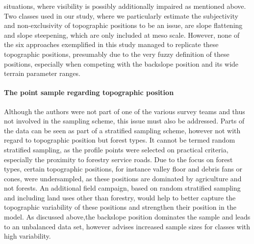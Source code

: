 \documentclass[preprint,12pt,authoryear]{elsarticle}
\begin{document}
situations, where visibility is possibly additionally impaired as mentioned above. Two classes used in our study, where we particularly estimate the subjectivity and non-exclusivity of topographic positions to be an issue, are slope flattening and slope steepening, which are only included at meso scale. However, none of the six approaches exemplified in this study managed to replicate these topographic positions, presumably due to the very fuzzy definition of these positions, especially when competing with the backslope position and its wide terrain parameter ranges.
\paragraph{The point sample regarding topographic position}
Although the authors were not part of one of the various survey teams and thus not involved in the sampling scheme, this issue must also be addressed. Parts of the data can be seen as part of a stratified sampling scheme, however not with regard to topographic position but forest types. It cannot be termed random stratified sampling, as the profile points were selected on practical criteria, especially the proximity to forestry service roads. Due to the focus on forest types, certain topographic positions, for instance valley floor and debris fans or cones, were undersampled, as these positions are dominated by agriculture and not forests. An additional field campaign, based on random stratified sampling and including land uses other than forestry, would help to better capture the topographic variability of these positions and strengthen their position in the model. As discussed above,the backslope position dominates the sample and leads to an unbalanced data set, however \cite{Congalton1991} advises increased sample sizes for classes with high variability.
\end{document}
